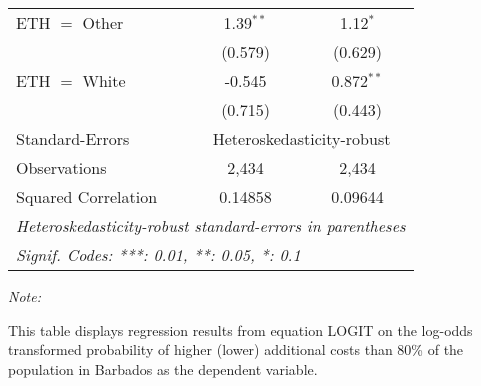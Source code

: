 \begin{table}[htbp!]
\begin{adjustbox}{width = 1\textwidth, max height = 0.95\textheight, center}
\begin{threeparttable}[b]
\begin{tabular}{lcc}
            ETH $=$ Other         & 1.39$^{**}$   & 1.12$^{*}$\\   
                                  & (0.579)       & (0.629)\\   
            ETH $=$ White         & -0.545        & 0.872$^{**}$\\   
                                  & (0.715)       & (0.443)\\   
            \midrule 
            Standard-Errors & \multicolumn{2}{c}{Heteroskedasticity-robust} \\ 
            Observations          & 2,434         & 2,434\\  
            Squared Correlation   & 0.14858       & 0.09644\\  
            \midrule \midrule
            \multicolumn{3}{l}{\emph{Heteroskedasticity-robust standard-errors in parentheses}}\\
            \multicolumn{3}{l}{\emph{Signif. Codes: ***: 0.01, **: 0.05, *: 0.1}}\\
         \end{tabular}
         
         \begin{tablenotes}\item \medskip \textit{Note:}
            \item This table displays regression results from equation LOGIT on the log-odds transformed probability of higher (lower) additional costs than 80\% of the population in Barbados as the dependent variable. 
         \end{tablenotes}
      \end{threeparttable}
   \end{adjustbox}
\end{table}


